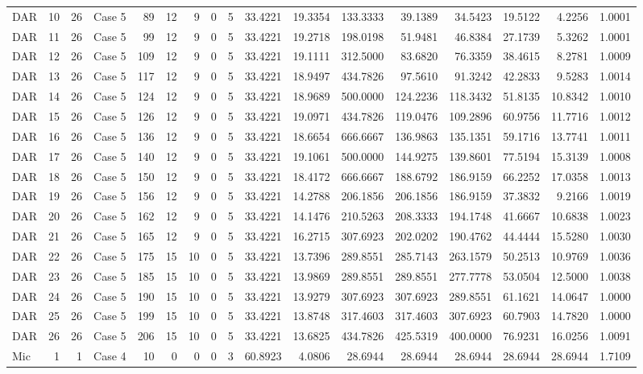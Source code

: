 \documentclass[
  12pt,
  letterpaper,
  DIV=11,
  numbers=noendperiod]{scrartcl}
\begin{document}
\begin{table}[!h]
{\begin{tabular}[t]{lrrlrrrrrrrrrrrrr}
DAR & 10 & 26 & Case 5 & 89 & 12 & 9 & 0 & 5 & 33.4221 & 19.3354 & 133.3333 & 39.1389 & 34.5423 & 19.5122 & 4.2256 & 1.0001\\
DAR & 11 & 26 & Case 5 & 99 & 12 & 9 & 0 & 5 & 33.4221 & 19.2718 & 198.0198 & 51.9481 & 46.8384 & 27.1739 & 5.3262 & 1.0001\\
DAR & 12 & 26 & Case 5 & 109 & 12 & 9 & 0 & 5 & 33.4221 & 19.1111 & 312.5000 & 83.6820 & 76.3359 & 38.4615 & 8.2781 & 1.0009\\
DAR & 13 & 26 & Case 5 & 117 & 12 & 9 & 0 & 5 & 33.4221 & 18.9497 & 434.7826 & 97.5610 & 91.3242 & 42.2833 & 9.5283 & 1.0014\\
\addlinespace
DAR & 14 & 26 & Case 5 & 124 & 12 & 9 & 0 & 5 & 33.4221 & 18.9689 & 500.0000 & 124.2236 & 118.3432 & 51.8135 & 10.8342 & 1.0010\\
DAR & 15 & 26 & Case 5 & 126 & 12 & 9 & 0 & 5 & 33.4221 & 19.0971 & 434.7826 & 119.0476 & 109.2896 & 60.9756 & 11.7716 & 1.0012\\
DAR & 16 & 26 & Case 5 & 136 & 12 & 9 & 0 & 5 & 33.4221 & 18.6654 & 666.6667 & 136.9863 & 135.1351 & 59.1716 & 13.7741 & 1.0011\\
DAR & 17 & 26 & Case 5 & 140 & 12 & 9 & 0 & 5 & 33.4221 & 19.1061 & 500.0000 & 144.9275 & 139.8601 & 77.5194 & 15.3139 & 1.0008\\
DAR & 18 & 26 & Case 5 & 150 & 12 & 9 & 0 & 5 & 33.4221 & 18.4172 & 666.6667 & 188.6792 & 186.9159 & 66.2252 & 17.0358 & 1.0013\\
\addlinespace
DAR & 19 & 26 & Case 5 & 156 & 12 & 9 & 0 & 5 & 33.4221 & 14.2788 & 206.1856 & 206.1856 & 186.9159 & 37.3832 & 9.2166 & 1.0019\\
DAR & 20 & 26 & Case 5 & 162 & 12 & 9 & 0 & 5 & 33.4221 & 14.1476 & 210.5263 & 208.3333 & 194.1748 & 41.6667 & 10.6838 & 1.0023\\
DAR & 21 & 26 & Case 5 & 165 & 12 & 9 & 0 & 5 & 33.4221 & 16.2715 & 307.6923 & 202.0202 & 190.4762 & 44.4444 & 15.5280 & 1.0030\\
DAR & 22 & 26 & Case 5 & 175 & 15 & 10 & 0 & 5 & 33.4221 & 13.7396 & 289.8551 & 285.7143 & 263.1579 & 50.2513 & 10.9769 & 1.0036\\
DAR & 23 & 26 & Case 5 & 185 & 15 & 10 & 0 & 5 & 33.4221 & 13.9869 & 289.8551 & 289.8551 & 277.7778 & 53.0504 & 12.5000 & 1.0038\\
\addlinespace
DAR & 24 & 26 & Case 5 & 190 & 15 & 10 & 0 & 5 & 33.4221 & 13.9279 & 307.6923 & 307.6923 & 289.8551 & 61.1621 & 14.0647 & 1.0000\\
DAR & 25 & 26 & Case 5 & 199 & 15 & 10 & 0 & 5 & 33.4221 & 13.8748 & 317.4603 & 317.4603 & 307.6923 & 60.7903 & 14.7820 & 1.0000\\
DAR & 26 & 26 & Case 5 & 206 & 15 & 10 & 0 & 5 & 33.4221 & 13.6825 & 434.7826 & 425.5319 & 400.0000 & 76.9231 & 16.0256 & 1.0091\\
Mic & 1 & 1 & Case 4 & 10 & 0 & 0 & 0 & 3 & 60.8923 & 4.0806 & 28.6944 & 28.6944 & 28.6944 & 28.6944 & 28.6944 & 1.7109\\
\bottomrule
\end{tabular}}
\end{table}
\end{document}
